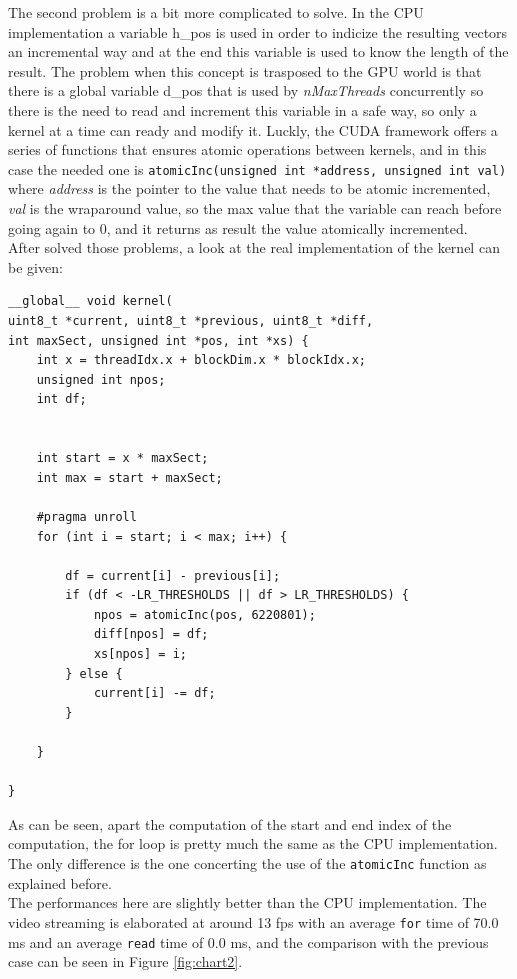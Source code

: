 \documentclass[paper=a4, fontsize=10pt]{scrartcl}	%
\begin{document}
	The second problem is a bit more complicated to solve. In the CPU implementation a variable h\_pos is used in order to indicize the resulting vectors an incremental way and at the end this variable is used to know the length of the result. The problem when this concept is trasposed to the GPU world is that there is a global variable d\_pos that is used by \textit{nMaxThreads} concurrently so there is the need to read and increment this variable in a safe way, so only a kernel at a time can ready and modify it. Luckly, the CUDA framework offers a series of functions that ensures atomic operations between kernels, and in this case the needed one is \texttt{atomicInc(unsigned int *address, unsigned int val)} where \textit{address} is the pointer to the value that needs to be atomic incremented, \textit{val} is the wraparound value, so the max value that the variable can reach before going again to 0, and it returns as result the value atomically incremented.\\

	After solved those problems, a look at the real implementation of the kernel can be given:
	
	\begin{lstlisting}[style=CStyle]
__global__ void kernel(
uint8_t *current, uint8_t *previous, uint8_t *diff, 
int maxSect, unsigned int *pos, int *xs) {
	int x = threadIdx.x + blockDim.x * blockIdx.x;
	unsigned int npos;
	int df;


	int start = x * maxSect;
	int max = start + maxSect;

	#pragma unroll
	for (int i = start; i < max; i++) {

		df = current[i] - previous[i];
		if (df < -LR_THRESHOLDS || df > LR_THRESHOLDS) {
			npos = atomicInc(pos, 6220801);
			diff[npos] = df;
			xs[npos] = i;
		} else {
			current[i] -= df;
		}

	}

}
	\end{lstlisting}

	As can be seen, apart the computation of the start and end index of the computation, the for loop is pretty much the same as the CPU implementation. The only difference is the one concerting the use of the \texttt{atomicInc} function as explained before.\\

	The performances here are slightly better than the CPU implementation. The video streaming is elaborated at around 13 fps with an average \texttt{for} time of 70.0 ms and an average \texttt{read} time of 0.0 ms, and the comparison with the previous case can be seen in Figure \ref{fig:chart2}. 
\end{document}
